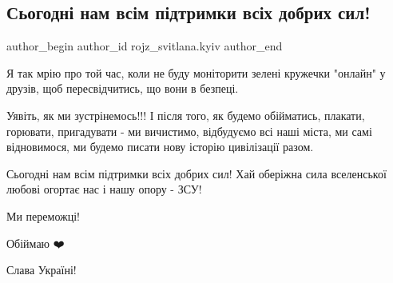  
 
 
 
 
 
\subsection{Сьогодні нам всім підтримки всіх добрих сил!}
\label{sec:27_02_2022.fb.rojz_svitlana.kyiv.4.mria}
 
\ifcmt
 author_begin
   author_id rojz_svitlana.kyiv
 author_end
\fi

Я так мрію про той час, коли не буду моніторити зелені кружечки "онлайн" у
друзів, щоб пересвідчитись, що вони в безпеці.

Уявіть, як ми зустрінемось!!! І після того, як будемо обійматись, плакати,
горювати, пригадувати - ми вичистимо, відбудуємо всі наші міста, ми самі
відновимося, ми будемо писати нову історію цивілізації  разом.

Сьогодні нам всім підтримки всіх добрих сил! Хай оберіжна сила  вселенської
любові огортає нас і нашу опору - ЗСУ!

Ми переможці!

Обіймаю ❤️

Слава Україні!

